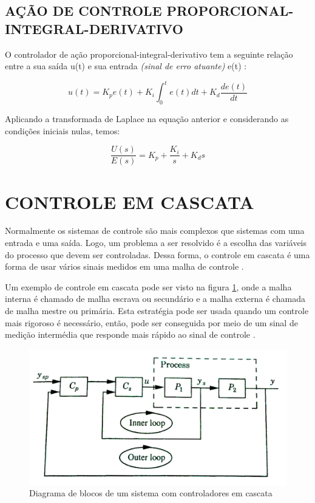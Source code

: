 \documentclass[12pt,oneside,a4paper, chapter=TITLE, section = TITLE, english, brazil]{abntex2}
\begin{document}
\subsection{AÇÃO DE CONTROLE PROPORCIONAL-INTEGRAL-DERIVATIVO}

O controlador de ação proporcional-integral-derivativo tem a seguinte relação entre a sua saída u(t) e sua entrada \textit{(sinal de erro atuante)} e(t) \cite{ogata}:

$$u(t) = K_{p}e(t) + K_{i} \int^{t}_0 e(t)dt + K_{d}\frac{de(t)}{dt}$$

Aplicando a transformada de Laplace na equação anterior e considerando as condições iniciais nulas, temos:

\begin{equation}
\frac{U(s)}{E(s)} = K_{p} + \frac{K_{i}}{s} + K_{d}s \label{eq:g_s_cont_prop_integ_deriv}
\end{equation}

\section{CONTROLE EM CASCATA}

Normalmente os sistemas de controle são mais complexos que sistemas com uma entrada e uma saída. Logo, um problema a ser resolvido é a escolha das variáveis do processo que devem ser controladas. Dessa forma, o controle em cascata é uma forma de usar vários sinais medidos em uma malha de controle \cite{astrom}.

Um exemplo de controle em cascata pode ser visto na figura \ref{fig:cont_cascata}, onde a malha interna é chamado de malha escrava ou secundário e a malha externa é chamada de malha mestre ou primária. Esta estratégia pode ser usada quando um controle mais rigoroso é necessário, então, pode ser conseguida por meio de um sinal de medição intermédia que responde mais rápido ao sinal de controle \cite{astrom}.

\begin{figure}[h] %
\centering
\includegraphics[scale=0.32]{./imagens/cont_casct}
\caption[Diagrama de blocos de um sistema com controladores em cascata]{Diagrama de blocos de um sistema com controladores em cascata \cite{astrom}}
\label{fig:cont_cascata}
\end{figure}
\end{document}
